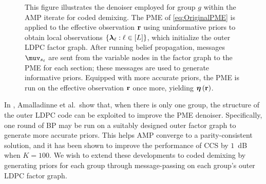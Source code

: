 \documentclass[journal]{IEEEtran}
\begin{document}
\begin{figure}[t!]
    \centering
    
    \caption{
        This figure illustrates the denoiser employed for group $g$ within the AMP iterate for coded demixing.
        The PME of \eqref{eq:OriginalPME} is applied to the effective observation $\mathbf{r}$ using uninformative priors to obtain local observations $\{\boldsymbol{\lambda}_\ell : \ell \in [L]\}$, which initialize the outer LDPC factor graph. 
        After running belief propagation, messages $\muv_{s_\ell}$ are sent from the variable nodes in the factor graph to the PME for each section; these messages are used to generate informative priors. 
        Equipped with more accurate priors, the PME is run on the effective observation $\mathbf{r}$ once more, yielding $\boldsymbol{\eta}\left( \mathbf{r} \right)$.
    }
    \label{fig:BPonFactorGraph}
\end{figure}

In \cite{amalladinne2020unsourced}, Amalladinne et al.\ show that, when there is only one group, the structure of the outer LDPC code can be exploited to improve the PME denoiser.
Specifically, one round of BP may be run on a suitably designed outer factor graph to generate more accurate priors.
This helps AMP converge to a parity-consistent solution, and it has been shown to improve the performance of CCS by $1$~dB when $K = 100$. 
We wish to extend these developments to coded demixing by generating priors for each group through message-passing on each group's outer LDPC factor graph.
\end{document}
